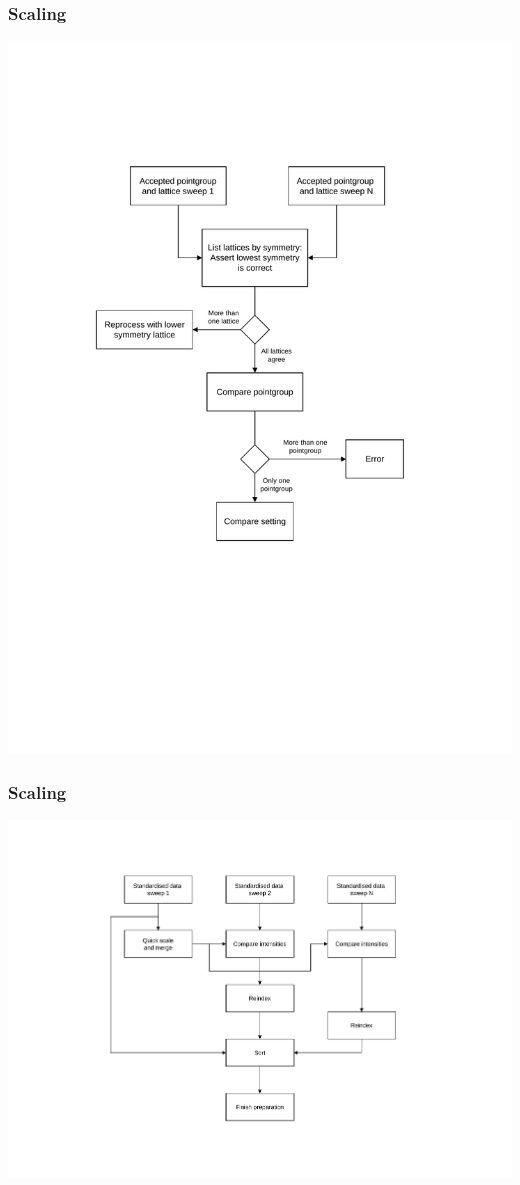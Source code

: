 \documentclass[slides,compress]{beamer}
\begin{document}
\begin{frame}
\frametitle{Scaling}
\hspace{2cm}
\includegraphics[scale=0.5]{figures/scaling-step-2.pdf}
\end{frame}

\begin{frame}
\frametitle{Scaling}
\hspace{2cm}
\includegraphics[scale=0.5]{figures/scaling-step-3.pdf}
\end{frame}
\end{document}
